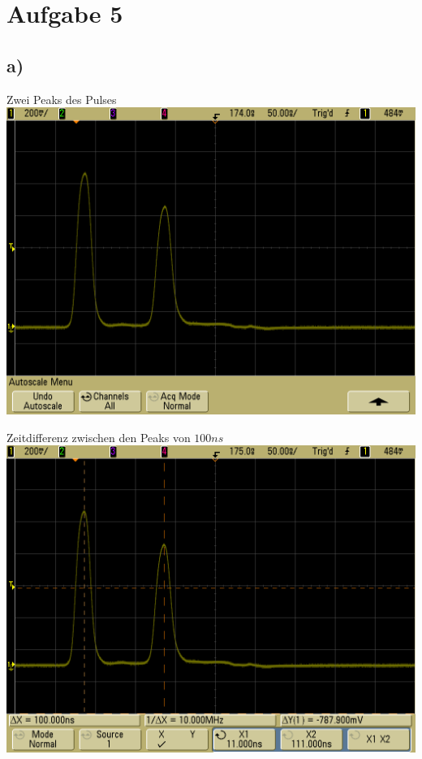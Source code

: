 \documentclass[compress,11pt]{beamer}
\begin{document}
\section{Aufgabe 5}
\subsection{a)}
\begin{frame}
\begin{block}{Zwei Peaks des Pulses}
\centering
\includegraphics[width=.85\textwidth]{../daten/scope_28.png}
\end{block}
\end{frame}
\begin{frame}
\begin{block}{Zeitdifferenz zwischen den Peaks von $100 ns$}
\centering
\includegraphics[width=.85\textwidth]{../daten/scope_29.png}
\end{block}
\end{frame}
\end{document}
